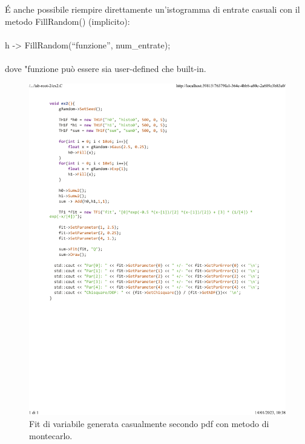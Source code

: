 \documentclass[10pt,a4paper]{article}
\begin{document}
\'{E} anche possibile riempire direttamente un'istogramma di entrate casuali con il metodo FillRandom() (implicito):\\\\
 h -> FillRandom(“funzione”, num\_entrate);\\\\
dove "funzione può essere sia user-defined che built-in. 
\newpage
\begin{figure}[h!]
	\centering
	\includegraphics[width=1.\linewidth]{_..._lab-root-2_ex2.C}
	\caption{Fit di variabile generata casualmente secondo pdf con metodo di montecarlo.}
	\label{fig:6}
\end{figure}
\newpage
\end{document}
